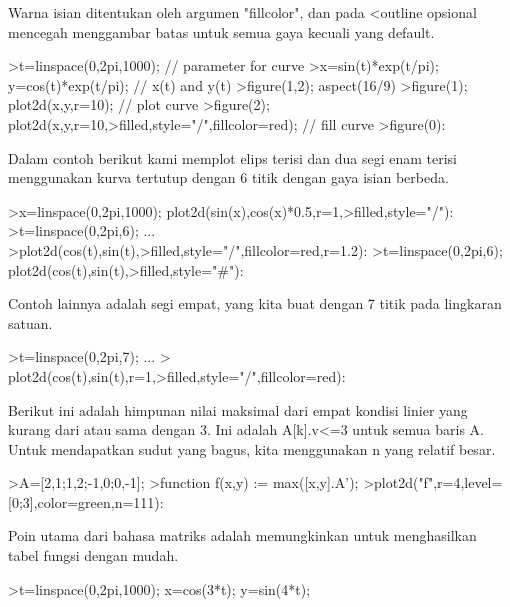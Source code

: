 \documentclass[a4paper,10pt]{article}
\begin{document}
\begin{eulernotebook}
\begin{eulercomment}
\begin{eulercomment}
\begin{eulercomment}
\begin{eulercomment}
\begin{eulercomment}
\begin{eulercomment}
\begin{eulercomment}
Warna isian ditentukan oleh argumen "fillcolor", dan pada \textless{}outline
opsional mencegah menggambar batas untuk semua gaya kecuali yang
default.
\end{eulercomment}
\begin{eulerprompt}
>t=linspace(0,2pi,1000); // parameter for curve
>x=sin(t)*exp(t/pi); y=cos(t)*exp(t/pi); // x(t) and y(t)
>figure(1,2); aspect(16/9)
>figure(1); plot2d(x,y,r=10); // plot curve
>figure(2); plot2d(x,y,r=10,>filled,style="/",fillcolor=red); // fill curve
>figure(0):
\end{eulerprompt}
\begin{eulercomment}
Dalam contoh berikut kami memplot elips terisi dan dua segi enam
terisi menggunakan kurva tertutup dengan 6 titik dengan gaya isian
berbeda.
\end{eulercomment}
\begin{eulerprompt}
>x=linspace(0,2pi,1000); plot2d(sin(x),cos(x)*0.5,r=1,>filled,style="/"):
>t=linspace(0,2pi,6); ...
>plot2d(cos(t),sin(t),>filled,style="/",fillcolor=red,r=1.2):
>t=linspace(0,2pi,6); plot2d(cos(t),sin(t),>filled,style="#"):
\end{eulerprompt}
\begin{eulercomment}
Contoh lainnya adalah segi empat, yang kita buat dengan 7 titik pada
lingkaran satuan.
\end{eulercomment}
\begin{eulerprompt}
>t=linspace(0,2pi,7);  ...
> plot2d(cos(t),sin(t),r=1,>filled,style="/",fillcolor=red):
\end{eulerprompt}
\begin{eulercomment}
Berikut ini adalah himpunan nilai maksimal dari empat kondisi linier
yang kurang dari atau sama dengan 3. Ini adalah A[k].v\textless{}=3 untuk semua
baris A. Untuk mendapatkan sudut yang bagus, kita menggunakan n yang
relatif besar.
\end{eulercomment}
\begin{eulerprompt}
>A=[2,1;1,2;-1,0;0,-1];
>function f(x,y) := max([x,y].A');
>plot2d("f",r=4,level=[0;3],color=green,n=111):
\end{eulerprompt}
\begin{eulercomment}
Poin utama dari bahasa matriks adalah memungkinkan untuk menghasilkan
tabel fungsi dengan mudah.
\end{eulercomment}
\begin{eulerprompt}
>t=linspace(0,2pi,1000); x=cos(3*t); y=sin(4*t);
\end{eulerprompt}
\begin{eulercomment}

\end{eulercomment}
\end{eulercomment}
\end{eulercomment}
\end{eulercomment}
\end{eulercomment}
\end{eulercomment}
\end{eulercomment}
\end{eulernotebook}
\end{document}
